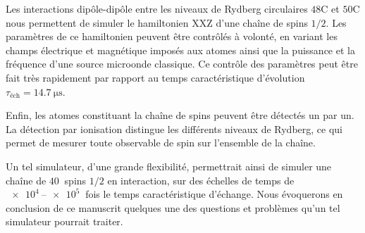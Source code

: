 Les interactions dipôle-dipôle entre les niveaux de Rydberg circulaires $\mathrm{48C}$ et $\mathrm{50C}$ nous permettent de simuler le hamiltonien XXZ d'une chaîne de spins $1/2$.
Les paramètres de ce hamiltonien peuvent être contrôlés à volonté, en variant les champs électrique et magnétique imposés aux atomes ainsi que la puissance et la fréquence d'une source microonde classique.
Ce contrôle des paramètres peut être fait très rapidement par rapport au temps caractéristique d'évolution $\tau_{\text{\'ech}} = \SI{14.7}{\us}$.

Enfin, les atomes constituant la chaîne de spins peuvent être détectés un par un.
La détection par ionisation distingue les différents niveaux de Rydberg, ce qui permet de mesurer toute observable de spin sur l'ensemble de la chaîne.

Un tel simulateur, d'une grande flexibilité, permettrait ainsi de simuler une chaîne de $\SI{40}{}$ spins $1/2$ en interaction, sur des échelles de temps de $\SIrange{e4}{e5}{}$ fois le temps caractéristique d'échange.
Nous évoquerons en conclusion de ce manuscrit quelques une des questions et problèmes qu'un tel simulateur pourrait traiter.














